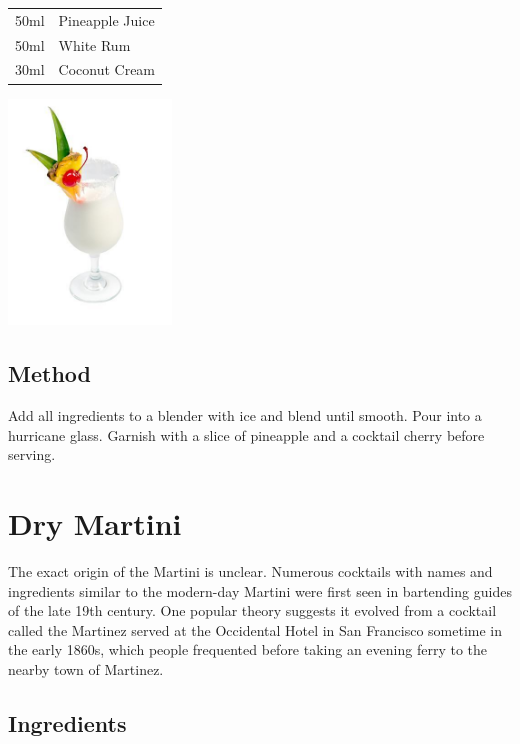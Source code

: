 \documentclass[12pt, letterpaper]{article}
\begin{document}
\begin{multicols}{2}

\begin{tabular} { r | l}
    50ml & Pineapple Juice \\
    50ml & White Rum \\
    30ml & Coconut Cream
\end{tabular}

\includegraphics[height=6cm]{pinacolada}

\end{multicols}

\subsection*{Method}
Add all ingredients to a blender with ice and blend until smooth.
Pour into a hurricane glass. Garnish with a slice of pineapple and a cocktail cherry before serving.

\pagebreak
\section{Dry Martini}
The exact origin of the Martini is unclear.
Numerous cocktails with names and ingredients similar 
to the modern-day Martini were first seen in bartending guides of the late 19th century.
One popular theory suggests it evolved from a cocktail called the Martinez served at the Occidental Hotel in San Francisco sometime in the early 1860s,
which people frequented before taking an evening ferry to the nearby town of Martinez.
\subsection*{Ingredients}
\end{document}
